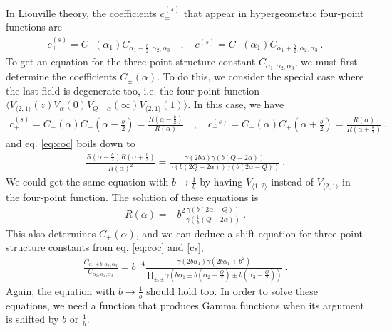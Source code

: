 \documentclass[12pt, a4paper]{article}
\theoremstyle{break}
\begin{document}
In Liouville theory, the coefficients $c^{(s)}_\pm$ that appear in hypergeometric four-point functions are 
\begin{align}
 c_{+}^{(s)} = C_+(\alpha_1) C_{\alpha_1-\frac{b}{2},\alpha_2,\alpha_3} 
\quad , \quad 
c_{-}^{(s)}  = C_-(\alpha_1) C_{\alpha_1+\frac{b}{2},\alpha_2,\alpha_3}\ .
\label{cs}
\end{align}
To get an equation for the three-point structure constant $C_{\alpha_1,\alpha_2,\alpha_3}$, we must first determine the  coefficients $C_\pm(\alpha)$. To do this, we consider the special case where the last field is degenerate too, i.e. the four-point function $\Big\langle V_{\langle 2,1 \rangle}(z) V_\alpha(0) V_{Q-\alpha}(\infty) V_{\langle 2,1 \rangle}(1)\Big\rangle$.
In this case, we have
\begin{align}
 c_{+}^{(s)} = C_+(\alpha)C_-(\alpha-\tfrac{b}{2}) = \frac{R(\alpha-\frac{b}{2})}{R(\alpha)} \quad , \quad c_{-}^{(s)} = C_-(\alpha)C_+(\alpha+\tfrac{b}{2}) = \frac{R(\alpha)}{R(\alpha+\frac{b}{2})}\ ,
\end{align}
and eq. \eqref{eq:coc} boils down to 
\begin{align}
 \frac{R(\alpha-\frac{b}{2})R(\alpha+\frac{b}{2})}{R(\alpha)^2} 
 = \frac{\gamma(2b\alpha)\gamma(b(Q-2\alpha))}{\gamma(b(2Q-2\alpha))\gamma(b(2\alpha-Q))}\ .
\end{align}
We could get the same equation with $b\to \frac{1}{b}$ by having $V_{\langle 1,2\rangle}$ instead of $V_{\langle 2,1\rangle}$ in the four-point function. The solution of these equations is
\begin{align}
 R(\alpha) = -b^2  \frac{\gamma(b(2\alpha-Q))}{\gamma(\frac{1}{b}(Q-2\alpha))}\ .
\end{align}
This also determines $C_\pm(\alpha)$, and we can deduce a shift equation for three-point structure constants from eq. \eqref{eq:coc} and \eqref{cs},
\begin{align}
 \frac{C_{\alpha_1+b,\alpha_2,\alpha_3}}{C_{\alpha_1,\alpha_2,\alpha_3}} = b^{-4}\frac{\gamma(2b\alpha_1)\gamma(2b\alpha_1+b^2)}{\prod_{\pm,\pm} \gamma\left(b\alpha_1\pm b(\alpha_2-\frac{Q}{2})\pm b(\alpha_3-\frac{Q}{2})\right)}\ .
\label{fcc}
\end{align}
Again, the equation with $b\to \frac{1}{b}$ should hold too. In order to solve these equations, we need a function that produces Gamma functions when its argument is shifted by $b$ or $\frac{1}{b}$. 
\end{document}
